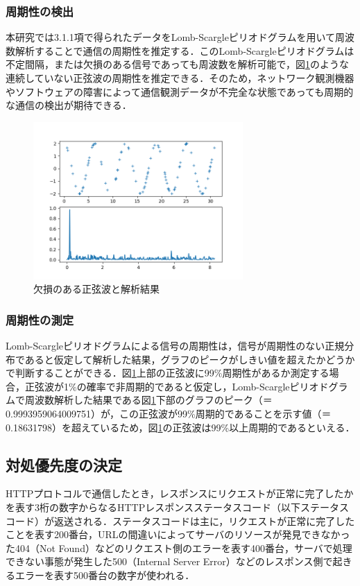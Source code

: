\documentclass[twocolumn]{ltjsarticle}
\begin{document}
\subsubsection{周期性の検出}
本研究では3.1.1項で得られたデータをLomb-Scargleピリオドグラム\cite{vanderplas2018understanding}を用いて周波数解析することで通信の周期性を推定する．このLomb-Scargleピリオドグラムは不定間隔，または欠損のある信号であっても周波数を解析可能で，図\ref{fig:lombscargle}のような連続していない正弦波の周期性を推定できる．そのため，ネットワーク観測機器やソフトウェアの障害によって通信観測データが不完全な状態であっても周期的な通信の検出が期待できる．
\begin{figure}[htbp]
  \centering
  \includegraphics[width=8cm]{images/20201214_修士論文予稿/lombscargle.png}
  \caption{欠損のある正弦波と解析結果}
  \label{fig:lombscargle}
\end{figure}

\subsubsection{周期性の測定}
Lomb-Scargleピリオドグラムによる信号の周期性は，信号が周期性のない正規分布であると仮定して解析した結果，グラフのピークがしきい値を超えたかどうかで判断することができる．図\ref{fig:lombscargle}上部の正弦波に99\%周期性があるか測定する場合，正弦波が1\%の確率で非周期的であると仮定し，Lomb-Scargleピリオドグラムで周波数解析した結果である図\ref{fig:lombscargle}下部のグラフのピーク（＝0.9993959064009751）が，この正弦波が99\%周期的であることを示す値（＝0.18631798）を超えているため，図\ref{fig:lombscargle}の正弦波は99\%以上周期的であるといえる．

\subsection{対処優先度の決定}
HTTPプロトコルで通信したとき，レスポンスにリクエストが正常に完了したかを表す3桁の数字からなるHTTPレスポンスステータスコード（以下ステータスコード）が返送される．ステータスコードは主に，リクエストが正常に完了したことを表す200番台，URLの間違いによってサーバのリソースが発見できなかった404（Not Found）などのリクエスト側のエラーを表す400番台，サーバで処理できない事態が発生した500（Internal Server Error）などのレスポンス側で起きるエラーを表す500番台の数字が使われる．
\end{document}
